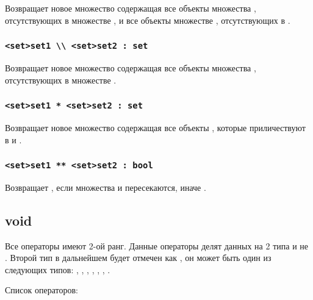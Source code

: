 \documentclass[a4paper, 14pt]{extarticle}
\begin{document}
Возвращает новое множество содержащая все объекты множества , отсутствующих в множестве , и все объекты множестве , отсутствующих в .

\subsubsection{\lstinline`<set>set1 \\ <set>set2 : set`}

Возвращает новое множество содержащая все объекты множества , отсутствующих в множестве .

\subsubsection{\lstinline`<set>set1 * <set>set2 : set`}

Возвращает новое множество содержащая все объекты , которые приличествуют в  и .

\subsubsection{\lstinline`<set>set1 ** <set>set2 : bool`}

Возвращает \true, если множества  и  пересекаются, иначе \false.

\subsection{\color{lightblue}void}

Все \void{} операторы имеют 2-ой ранг. Данные операторы делят данных на 2 типа \void{} и не \void{}. Второй тип в дальнейшем будет отмечен как , он может быть один из следующих типов: \integer{}, \double{}, \str{}, \listtype{}, \object{}, \set{}, \element{}.

Список \void{} операторов:
\end{document}
